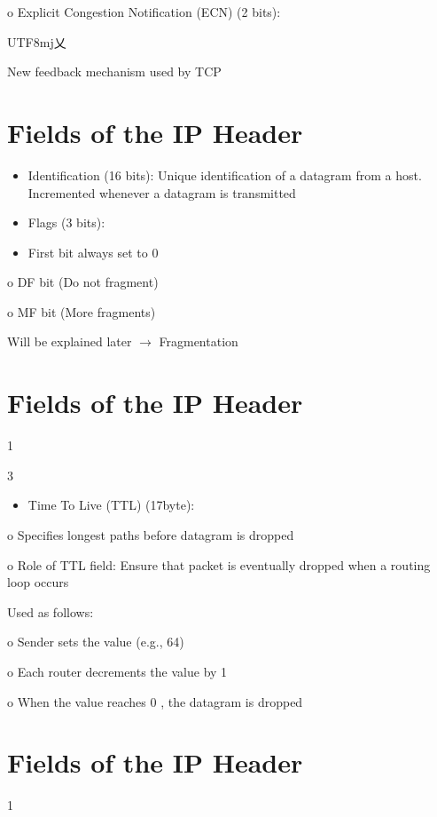 \documentclass[10pt]{article}
\begin{document}
o Explicit Congestion Notification (ECN) (2 bits):

\begin{CJK}{UTF8}{mj}乂\end{CJK} New feedback mechanism used by TCP

\section*{Fields of the IP Header }


\begin{itemize}
  \item Identification (16 bits): Unique identification of a datagram from a host. Incremented whenever a datagram is transmitted

  \item Flags (3 bits):

  \item First bit always set to 0

\end{itemize}

o DF bit (Do not fragment)

o MF bit (More fragments)

Will be explained later $\rightarrow$ Fragmentation

\section{Fields of the IP Header}
1

3

\begin{itemize}
  \item Time To Live (TTL) (17byte):
\end{itemize}

o Specifies longest paths before datagram is dropped

o Role of TTL field: Ensure that packet is eventually dropped when a routing loop occurs

Used as follows:

o Sender sets the value (e.g., 64)

o Each router decrements the value by 1

o When the value reaches 0 , the datagram is dropped

\section{Fields of the IP Header}
1
\end{document}
